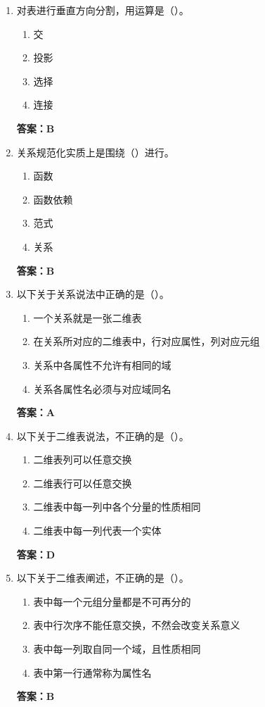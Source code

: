 \documentclass[12pt, a4paper]{article}
\begin{document}
\begin{enumerate}[label=\arabic*.]
	\item 对表进行垂直方向分割，用运算是（\quad）。
	      \begin{enumerate}
		      \item 交
		      \item 投影
		      \item 选择
		      \item 连接
	      \end{enumerate}
	      \textbf{答案：B}

	\item 关系规范化实质上是围绕（\quad）进行。
	      \begin{enumerate}
		      \item 函数
		      \item 函数依赖
		      \item 范式
		      \item 关系
	      \end{enumerate}
	      \textbf{答案：B}

	\item 以下关于关系说法中正确的是（\quad）。
	      \begin{enumerate}
		      \item 一个关系就是一张二维表
		      \item 在关系所对应的二维表中，行对应属性，列对应元组
		      \item 关系中各属性不允许有相同的域
		      \item 关系各属性名必须与对应域同名
	      \end{enumerate}
	      \textbf{答案：A}

	\item 以下关于二维表说法，不正确的是（\quad）。
	      \begin{enumerate}
		      \item 二维表列可以任意交换
		      \item 二维表行可以任意交换
		      \item 二维表中每一列中各个分量的性质相同
		      \item 二维表中每一列代表一个实体
	      \end{enumerate}
	      \textbf{答案：D}

	\item 以下关于二维表阐述，不正确的是（\quad）。
	      \begin{enumerate}
		      \item 表中每一个元组分量都是不可再分的
		      \item 表中行次序不能任意交换，不然会改变关系意义
		      \item 表中每一列取自同一个域，且性质相同
		      \item 表中第一行通常称为属性名
	      \end{enumerate}
	      \textbf{答案：B}


\end{enumerate}
\end{document}
